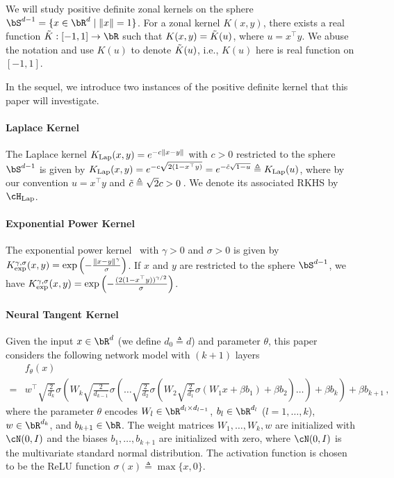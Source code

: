 \documentclass[11pt]{article}
\newcommand{\hlap}{\cH_{\textnormal{Lap}}}
\newcommand{\klap}{K_{\textnormal{Lap}}}
\newcommand{\kexp}{K_{\textnormal{exp}}}
\begin{document}
We will study positive definite zonal kernels on the sphere $\bS^{d-1} = \{x\in \bR^d  \mid  \|x\|=1\}$. 
For a zonal kernel $K(x,y)$, there exists a real function $\Tilde{K}:[-1,1]\to \bR$ such that $K(x,y)=\Tilde{K}(u)$, where $u = x^\top y$. 
We abuse the notation and use $K(u)$ to denote $\Tilde{K}(u)$, i.e., $K(u)$ here is real function on $[-1,1]$. 

In the sequel, we introduce two instances of the positive definite kernel that this paper will investigate.

\paragraph{Laplace Kernel}
The Laplace kernel $\klap(x,y) = e^{-c\|x-y\|}$ with $c>0$ restricted to the sphere $\bS^{d-1}$ is given by $
\klap(x,y) = e^{-c\sqrt{2(1-x^\top y)}} = e^{-\Tilde{c}\sqrt{1-u}} \triangleq \klap(u)
$,
where by our convention $u=x^\top y$ and $\Tilde{c}\triangleq \sqrt{2}c>0$\,. We denote its associated RKHS by $\hlap$. 

\paragraph{Exponential Power Kernel}
The exponential power kernel~\citep{hui2019kernel} with $\gamma>0$ and $\sigma>0$ is given by $
\kexp^{\gamma,\sigma}(x,y) = \exp\left(-\frac{\|x-y\|^\gamma}{\sigma}\right)
$.
If $x$ and $y$ are restricted to the sphere $\bS^{d-1}$, we have $
\kexp^{\gamma,\sigma}(x,y) =  \exp\left(-\frac{(2(1-x^\top y))^{\gamma/2}}{\sigma}\right)
$.

\paragraph{Neural Tangent Kernel}
Given the input $x\in \bR^{d}$ (we define $d_0\triangleq d$) and parameter $\theta$, this paper considers the following network model with $(k+1)$ layers
\begin{equation}\label{eq:net}
    \begin{split}
& f_{\theta}(x)\\ ={}& 
w^\top \sqrt{\frac{2}{d_k}} \sigma\left( W_{k} \sqrt{\frac{2}{d_{k-1}}} \sigma\left( \dots \sqrt{\frac{2}{d_2}}\sigma\left(  W_2 \sqrt{\frac{2}{d_1}}\sigma\left(W_1 x + \beta b_1\right) + \beta b_2 \right) \dots \right) + \beta b_k \right) + \beta b_{k+1} \,,
\end{split}
\end{equation}
where the parameter $\theta$ encodes $W_l\in \bR^{d_l\times d_{l-1}}$,  $b_l\in \bR^{d_l}$ ($l=1,\dots,k$), $w\in \bR^{d_k}$, and $b_{k+1} \in \bR$. 
The weight matrices $W_1,\dots,W_{k},w$ are initialized with $\cN(0,I)$ and the biases $b_1,\dots,b_{k+1}$ are initialized with zero, where $\cN(0,I)$ is the multivariate standard normal distribution. 
The activation function is chosen to be the ReLU function $\sigma(x)\triangleq \max\{x,0\}$. 
\end{document}
